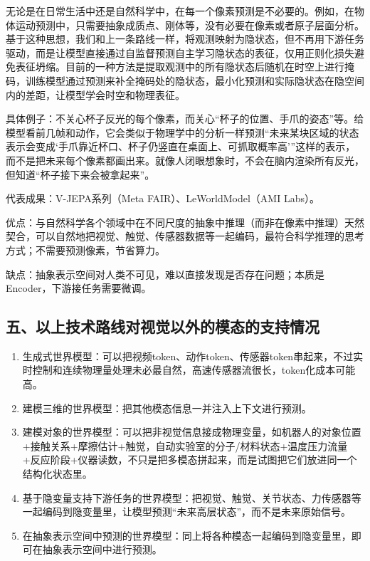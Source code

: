 无论是在日常生活中还是自然科学中，在每一个像素预测是不必要的。例如，在物体运动预测中，只需要抽象成质点、刚体等，没有必要在像素或者原子层面分析。基于这种思想，我们和上一条路线一样，将观测映射为隐状态，但不再用下游任务驱动，而是让模型直接通过自监督预测自主学习隐状态的表征，仅用正则化损失避免表征坍缩。目前的一种方法是提取观测中的所有隐状态后随机在时空上进行掩码，训练模型通过预测来补全掩码处的隐状态，最小化预测和实际隐状态在隐空间内的差距，让模型学会时空和物理表征。

具体例子：不关心杯子反光的每个像素，而关心``杯子的位置、手爪的姿态''等。给模型看前几帧和动作，它会类似于物理学中的分析一样预测``未来某块区域的状态表示会变成`手爪靠近杯口、杯子仍竖直在桌面上、可抓取概率高'''这样的表示，而不是把未来每个像素都画出来。就像人闭眼想象时，不会在脑内渲染所有反光，但知道``杯子接下来会被拿起来''。

代表成果：V-JEPA系列（Meta FAIR）、LeWorldModel（AMI Labs）。

优点：与自然科学各个领域中在不同尺度的抽象中推理（而非在像素中推理）天然契合，可以自然地把视觉、触觉、传感器数据等一起编码，最符合科学推理的思考方式；不需要预测像素，节省算力。

缺点：抽象表示空间对人类不可见，难以直接发现是否存在问题；本质是Encoder，下游接任务需要微调。

\hypertarget{ux4e94ux4ee5ux4e0aux6280ux672fux8defux7ebfux5bf9ux89c6ux89c9ux4ee5ux5916ux7684ux6a21ux6001ux7684ux652fux6301ux60c5ux51b5}{%
\subsection{五、以上技术路线对视觉以外的模态的支持情况}\label{ux4e94ux4ee5ux4e0aux6280ux672fux8defux7ebfux5bf9ux89c6ux89c9ux4ee5ux5916ux7684ux6a21ux6001ux7684ux652fux6301ux60c5ux51b5}}

\begin{enumerate}
\def\labelenumi{\arabic{enumi}.}
\item
  生成式世界模型：可以把视频token、动作token、传感器token串起来，不过实时控制和连续物理量处理未必最自然，高速传感器流很长，token化成本可能高。
\item
  建模三维的世界模型：把其他模态信息一并注入上下文进行预测。
\item
  建模对象的世界模型：可以把非视觉信息接成物理变量，如机器人的对象位置+接触关系+摩擦估计+触觉，自动实验室的分子/材料状态+温度压力流量+反应阶段+仪器读数，不只是把多模态拼起来，而是试图把它们放进同一个结构化状态里。
\item
  基于隐变量支持下游任务的世界模型：把视觉、触觉、关节状态、力传感器等一起编码到隐变量里，让模型预测``未来高层状态''，而不是未来原始信号。
\item
  在抽象表示空间中预测的世界模型：同上将各种模态一起编码到隐变量里，即可在抽象表示空间中进行预测。
\end{enumerate}

